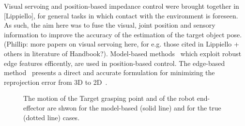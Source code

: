 Visual servoing and position-based impedance control were brought together in [Lippiello], for general tasks in which contact with the environment is foreseen. As such, the aim here was to fuse the visual, joint position and sensory information to improve the accuracy of the estimation of the target object pose. (Phillip: more papers on visual servoing here, for e.g. those cited in Lippiello + others in literature of Handbook?). Model-based methods~\cite{Comport2004, Drummond2002} which exploit robust edge features efficently, are used in position-based control. The edge-based method~\cite{Drummond2002} presents a direct and accurate formulation for minimizing the reprojection error from 3D to 2D~\cite{Oumer2015}. 
%
%
%
%
%
\begin{figure}[t!]
\caption{The motion of the Target grasping point and of the robot end-effector are shwon for the model-based (solid line) and for the true (dotted line) cases.}
\label{fig:motivation}
\end{figure}
%
